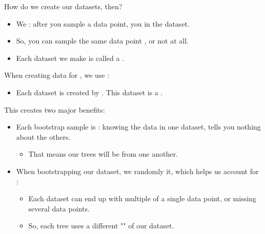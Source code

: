         How do we create our datasets, then?

        \begin{itemize}
            \item We : after you sample a data point, you  in the dataset.

            \item So, you can sample the same data point , or not at all.

            \item Each dataset we make is called a .\\
        \end{itemize}

        \begin{concept}
            When creating data for , we use :

            \begin{itemize}
                \item Each dataset is created by . This dataset is a .
            \end{itemize}

            \subsecdiv

            This creates two major benefits:

            \begin{itemize}
                \item Each bootstrap sample is : knowing the data in one dataset, tells you nothing about the others.
                    \begin{itemize}
                        \item That means our trees will be  from one another.
                    \end{itemize}

                \item When bootstrapping our dataset, we randomly  it, which helps us account for :

                \begin{itemize}
                    \item Each dataset can end up with multiple of a single data point, or missing several data points.

                    \item So, each tree uses a different "" of our dataset.
                \end{itemize}
            \end{itemize}
        \end{concept}

